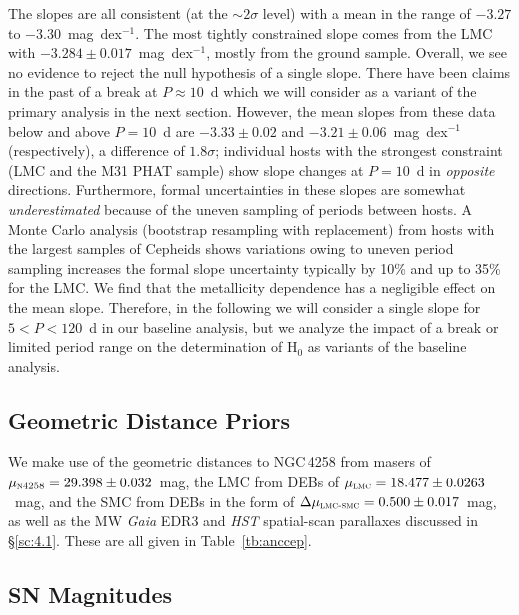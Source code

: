 \documentclass[12pt]{aastex631}
\begin{document}
The slopes are all consistent (at the $\sim 2\sigma$ level) with a mean in the range of $-3.27$ to $-3.30$~mag~dex$^{-1}$. The most tightly constrained slope comes from the LMC with $-3.284\pm0.017$~mag~dex$^{-1}$, mostly from the ground sample. Overall, we see no evidence to reject the null hypothesis of a single slope. There have been claims in the past of a break at $P\approx 10$~d which we will consider as a variant of the primary analysis in the next section.  However, the mean slopes from these data below and above $P=10$~d are $-3.33\pm0.02$ and $-3.21\pm0.06$~mag~dex$^{-1}$ (respectively), a difference of $1.8\sigma$; individual hosts with the strongest constraint (LMC and the M31 PHAT sample) show slope changes at $P=10$~d in {\it opposite} directions.  Furthermore, formal uncertainties in these slopes are somewhat {\it underestimated} because of the uneven sampling of periods between hosts.  A Monte Carlo analysis (bootstrap resampling with replacement) from hosts with the largest samples of Cepheids shows variations owing to uneven period sampling increases the formal slope uncertainty typically by 10\% and up to 35\% for the LMC. We find that the metallicity dependence has a negligible effect on the mean slope.  Therefore, in the following we will consider a single slope for $5<P<120$~d in our baseline analysis, but we analyze the impact of a break or limited period range on the determination of H$_0$ as variants of the baseline analysis.  
  
\subsection{Geometric Distance Priors\label{sc:4.7}}
  
We make use of the geometric distances to NGC$\,$4258 from masers \citep{Reid:2019} of $\mu_\textsc{n4258}=29.398\pm0.032$~mag, the LMC from DEBs \citep{Pietrzynski:2019} of $\mu_\textsc{lmc}=18.477\pm0.0263$~mag, and the SMC from DEBs \citep{Graczyk:2020} in the form of $\Delta\mu_\textsc{lmc-smc}=0.500\pm0.017$~mag, as well as the MW {\it Gaia} EDR3 and {\it HST} spatial-scan parallaxes discussed in \S\ref{sc:4.1}. These are all given in Table~\ref{tb:anccep}.

\subsection{SN Magnitudes\label{sc:4.8}}
  
\end{document}
